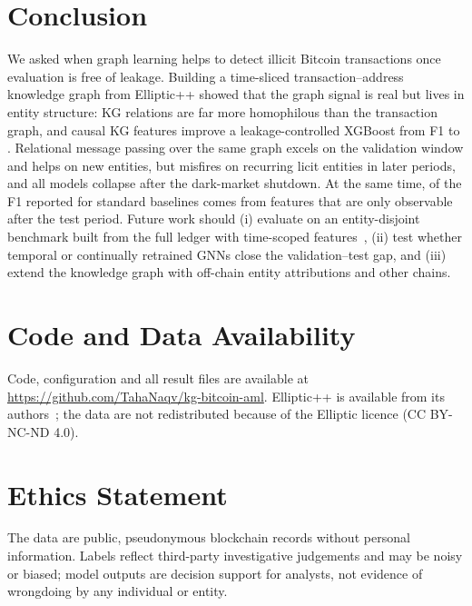 \section{Conclusion}\label{sec:conclusion}

We asked when graph learning helps to detect illicit Bitcoin transactions once
evaluation is free of leakage. Building a time-sliced transaction--address
knowledge graph from Elliptic++ showed that the graph signal is real but lives
in entity structure: KG relations are far more homophilous than the
transaction graph, and causal KG features improve a leakage-controlled
XGBoost from F1 \XgbCleanFone{} to \XgbCleanKgFone{}. Relational message
passing over the same graph excels on the validation window and helps on new
entities, but misfires on recurring licit entities in later periods, and all
models collapse after the dark-market shutdown. At the same time, \XgbLeakShare{} of the F1 reported for standard
baselines comes from features that are only observable after the test period.
Future work should (i) evaluate on an entity-disjoint benchmark built from
the full ledger with time-scoped features~\cite{safar2026}, (ii) test whether
temporal or continually retrained GNNs close the validation--test gap, and
(iii) extend the knowledge graph with off-chain entity attributions and other
chains.

\section*{Code and Data Availability}
Code, configuration and all result files are available at
\url{https://github.com/TahaNaqv/kg-bitcoin-aml}. Elliptic++ is available from
its authors~\cite{elmougy2023}; the data are not redistributed because of the
Elliptic licence (CC BY-NC-ND 4.0).

\section*{Ethics Statement}
The data are public, pseudonymous blockchain records without personal
information. Labels reflect third-party investigative judgements and may be
noisy or biased; model outputs are decision support for analysts, not
evidence of wrongdoing by any individual or entity.
